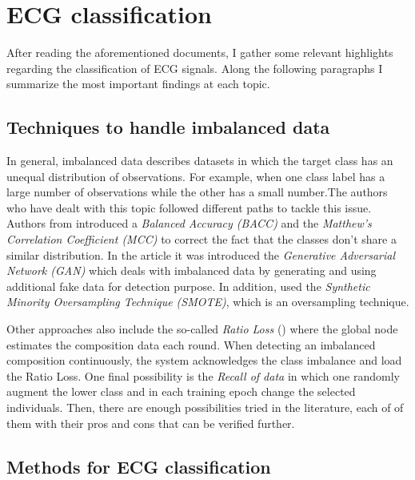 \section{ECG classification} \label{3state_art_ECG}

After reading the aforementioned documents, I gather some relevant highlights regarding the classification of ECG signals. Along the following paragraphs I summarize the most important findings at each topic.

\subsection{Techniques to handle imbalanced data}

In general, imbalanced data describes datasets in which the target class has an unequal distribution of observations. For example, when one class label has a large number of observations while the other has a small number.The authors who have dealt with this topic followed different paths to tackle this issue. Authors from \cite{imbalance_data1} introduced a \textit{Balanced Accuracy (BACC)} and the \textit{Matthew’s Correlation Coefficient (MCC)} to correct the fact that the classes don't share a similar distribution. In the article \cite{imbalance_data2} it was introduced the \textit{Generative Adversarial Network (GAN)} which deals with imbalanced data by generating and using additional fake data for detection purpose. In addition, \cite{imbalance_data3} used the \textit{Synthetic Minority Oversampling Technique (SMOTE)}, which is an oversampling technique. 

Other approaches also include the so-called \textit{Ratio Loss} (\cite{imbalance_data4}) where the global node estimates the composition data each round. When detecting an imbalanced composition continuously, the system acknowledges the class imbalance and load the Ratio Loss. One final possibility is the \textit{Recall of data} in which one randomly augment the lower class and in each training epoch change the selected individuals. Then, there are enough possibilities tried in the literature, each of of them with their pros and cons that can be verified further.



\subsection{Methods for ECG classification} \label{methods_ECG_class}


